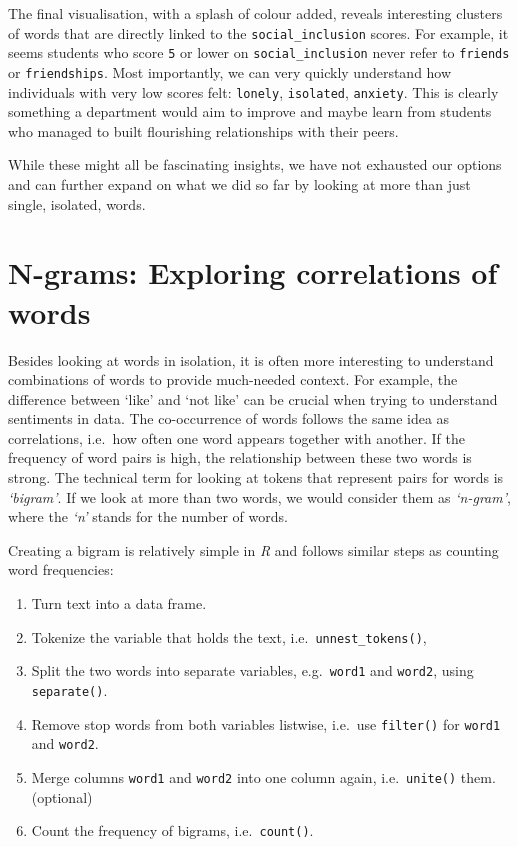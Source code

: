 \documentclass[
  letterpaper,
  DIV=11,
  numbers=noendperiod]{scrreprt}
\providecommand{\tightlist}{%
  \setlength{\itemsep}{0pt}\setlength{\parskip}{0pt}}\usepackage{longtable,booktabs,array}
\begin{document}
The final visualisation, with a splash of colour added, reveals
interesting clusters of words that are directly linked to the
\texttt{social\_inclusion} scores. For example, it seems students who
score \texttt{5} or lower on \texttt{social\_inclusion} never refer to
\texttt{friends} or \texttt{friendships}. Most importantly, we can very
quickly understand how individuals with very low scores felt:
\texttt{lonely}, \texttt{isolated}, \texttt{anxiety}. This is clearly
something a department would aim to improve and maybe learn from
students who managed to built flourishing relationships with their
peers.

While these might all be fascinating insights, we have not exhausted our
options and can further expand on what we did so far by looking at more
than just single, isolated, words.

\section{N-grams: Exploring correlations of words}\label{sec-n-grams}

Besides looking at words in isolation, it is often more interesting to
understand combinations of words to provide much-needed context. For
example, the difference between `like' and `not like' can be crucial
when trying to understand sentiments in data. The co-occurrence of words
follows the same idea as correlations, i.e.~how often one word appears
together with another. If the frequency of word pairs is high, the
relationship between these two words is strong. The technical term for
looking at tokens that represent pairs for words is \emph{`bigram'}. If
we look at more than two words, we would consider them as
\emph{`n-gram'}, where the \emph{`n'} stands for the number of words.

Creating a bigram is relatively simple in \emph{R} and follows similar
steps as counting word frequencies:

\begin{enumerate}
\def\labelenumi{\arabic{enumi}.}
\tightlist
\item
  Turn text into a data frame.
\item
  Tokenize the variable that holds the text,
  i.e.~\texttt{unnest\_tokens()},
\item
  Split the two words into separate variables, e.g.~\texttt{word1} and
  \texttt{word2}, using \texttt{separate()}.
\item
  Remove stop words from both variables listwise, i.e.~use
  \texttt{filter()} for \texttt{word1} and \texttt{word2}.
\item
  Merge columns \texttt{word1} and \texttt{word2} into one column again,
  i.e.~\texttt{unite()} them. (optional)
\item
  Count the frequency of bigrams, i.e.~\texttt{count()}.
\end{enumerate}
\end{document}

